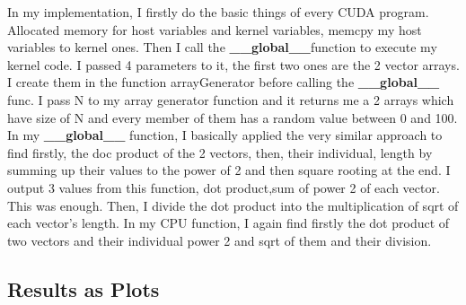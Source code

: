 \documentclass[a4paper,11pt]{article}
\theoremstyle{mytheor}
\begin{document}
In my implementation, I firstly do the basic things of every CUDA program. Allocated memory for host variables and kernel variables, memcpy my host variables to kernel ones. Then I call the \textbf{\_\_global\_\_}function to execute my kernel code. I passed 4 parameters to it, the first two ones are the 2 vector arrays. I create them in the function arrayGenerator before calling the \textbf{\_\_global\_\_} func. I pass N to my array generator function and it returns me a 2 arrays which have size of N and every member of them has a random value between 0 and 100. In my \textbf{\_\_global\_\_} function, I basically applied the very similar approach to find firstly, the doc product of the 2 vectors, then, their individual, length by summing up their values to the power of 2 and then square rooting at the end. I output 3 values from this function, dot product,sum of power 2 of each vector. This was enough. Then, I divide the dot product into the multiplication of sqrt of each vector’s length. In my CPU function, I again find firstly the dot product of two vectors and their individual power 2 and sqrt of them and their division.

\subsection{Results as Plots}
\end{document}

